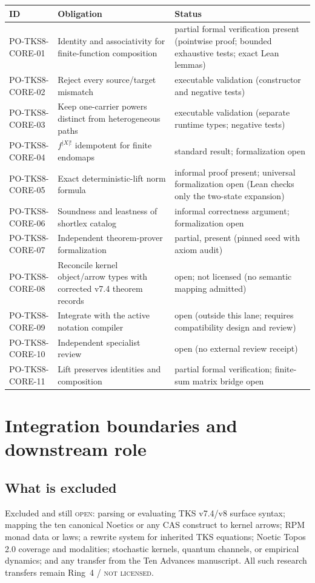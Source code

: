 \documentclass[11pt]{amsart}
\theoremstyle{definition}
\theoremstyle{remark}
\begin{document}
\begin{center}
\small
\begin{tabular}{@{}lp{6.1cm}p{4.6cm}@{}}
\toprule
ID & Obligation & Status \\
\midrule
PO-TKS8-CORE-01 & Identity and associativity for finite-function composition & partial formal verification present (pointwise proof; bounded exhaustive tests; exact Lean lemmas) \\
PO-TKS8-CORE-02 & Reject every source/target mismatch & executable validation (constructor and negative tests) \\
PO-TKS8-CORE-03 & Keep one-carrier powers distinct from heterogeneous paths & executable validation (separate runtime types; negative tests) \\
PO-TKS8-CORE-04 & $f^{|X|!}$ idempotent for finite endomaps & standard result; formalization open \\
PO-TKS8-CORE-05 & Exact deterministic-lift norm formula & informal proof present; universal formalization open (Lean checks only the two-state expansion) \\
PO-TKS8-CORE-06 & Soundness and leastness of shortlex catalog & informal correctness argument; formalization open \\
PO-TKS8-CORE-07 & Independent theorem-prover formalization & partial, present (pinned seed with axiom audit) \\
PO-TKS8-CORE-08 & Reconcile kernel object/arrow types with corrected v7.4 theorem records & open; not licensed (no semantic mapping admitted) \\
PO-TKS8-CORE-09 & Integrate with the active notation compiler & open (outside this lane; requires compatibility design and review) \\
PO-TKS8-CORE-10 & Independent specialist review & open (no external review receipt) \\
PO-TKS8-CORE-11 & Lift preserves identities and composition & partial formal verification; finite-sum matrix bridge open \\
\bottomrule
\end{tabular}
\end{center}

\section{Integration boundaries and downstream role}\label{sec:boundaries}

\subsection{What is excluded}
Excluded and still \textsc{open}: parsing or evaluating TKS v7.4/v8 surface syntax; mapping the ten canonical Noetics or any CAS construct to kernel arrows; RPM monad data or laws; a rewrite system for inherited TKS equations; Noetic Topos 2.0 coverage and modalities; stochastic kernels, quantum channels, or empirical dynamics; and any transfer from the Ten Advances manuscript. All such research transfers remain Ring~4 / \textsc{not licensed}.
\end{document}
